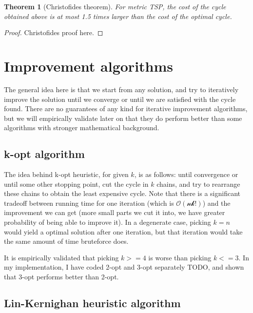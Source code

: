 \documentclass[12pt,twoside,notitlepage]{report}
\newtheorem{theorem}{Theorem}
\begin{document}
\begin{theorem}[Christofides theorem]

For metric TSP, the cost of the cycle obtained above is at most 1.5 times larger than the cost of the optimal cycle.

\end{theorem}

\begin{proof}

Christofides proof here.

\end{proof}

\section{Improvement algorithms}

The general idea here is that we start from any solution, and try to iteratively improve the solution until we converge or until we are satisfied with the cycle found. There are no guarantees of any kind for iterative improvement algorithms, but we will empirically validate later on that they do perform better than some algorithms with stronger mathematical background.

\subsection{k-opt algorithm}

The idea behind k-opt heuristic, for given $k$, is as follows: until convergence or until some other stopping point, cut the cycle in $k$ chains, and try to rearrange these chains to obtain the least expensive cycle. Note that there is a significant tradeoff between running time for one iteration (which is $\mathcal{O(nk!)}$) and the improvement we can get (more small parts we cut it into, we have greater probability of being able to improve it). In a degenerate case, picking $k = n$ would yield a optimal solution after one iteration, but that iteration would take the same amount of time bruteforce does. 

\smallskip

It is empirically validated that picking $k >= 4$ is worse than picking $k <= 3$. In my implementation, I have coded 2-opt and 3-opt separately TODO, and shown that 3-opt performs better than 2-opt.

\subsection{Lin-Kernighan heuristic algorithm}
\end{document}
